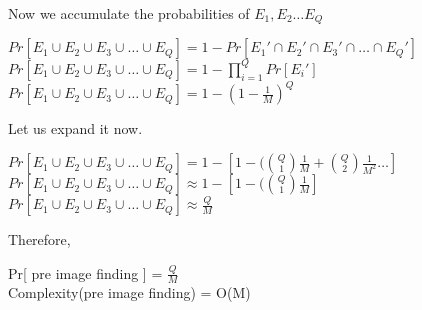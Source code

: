 \documentclass[11pt]{article}
\begin{document}
Now we accumulate the probabilities of $E_1, E_2 \dots E_Q$
\begin{center}
    $Pr[E_1 \cup E_2 \cup E_3 \cup \dots \cup E_Q] = 1 - Pr[{E_1}' \cap {E_2}' \cap {E_3}' \cap \dots \cap {E_Q}']$\\
    \vspace{3mm}
    $Pr[E_1 \cup E_2 \cup E_3 \cup \dots \cup E_Q] = 1 - \prod_{i=1}^{Q} Pr[{E_i}']$\\
    \vspace{3mm}
    $Pr[E_1 \cup E_2 \cup E_3 \cup \dots \cup E_Q] = 1 - {(1-\frac{1}{M})}^Q$
\end{center}
Let us expand it now. 
\begin{center}
    $Pr[E_1 \cup E_2 \cup E_3 \cup \dots \cup E_Q] = 1 - [1-(\binom{Q}{1} \frac{1}{M} + \binom{Q}{2} \frac{1}{M^2} \dots]$\\
    \vspace{3mm}
    $Pr[E_1 \cup E_2 \cup E_3 \cup \dots \cup E_Q] \approx  1 - [1-(\binom{Q}{1} \frac{1}{M}]$\\
    \vspace{3mm}
    $Pr[E_1 \cup E_2 \cup E_3 \cup \dots \cup E_Q] \approx \frac{Q}{M}$
\end{center}
Therefore, 
\begin{center}
    Pr[ pre image finding ] = $\frac{Q}{M}$\\
    \vspace{3mm}
    Complexity(pre image finding) = O(M)
\end{center}
\end{document}
